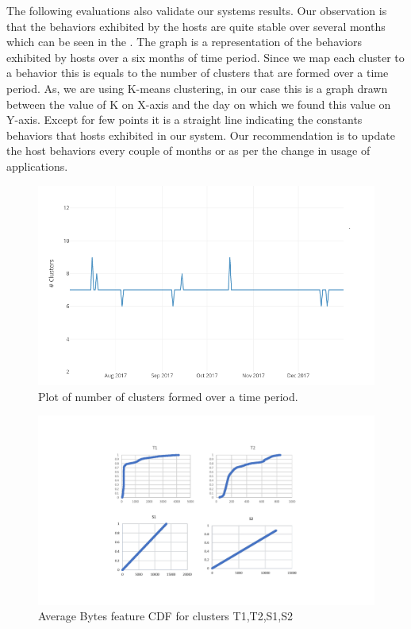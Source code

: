 The following evaluations also validate our systems results.
Our observation is that the behaviors exhibited by the hosts are quite stable over several months which can be seen in the  . The graph is a representation of the behaviors exhibited by hosts over a six months of time period. Since we map each cluster to a behavior this is equals to the number of clusters that are formed over a time period. As, we are using K-means clustering, in our case this is a graph drawn between the  value of K on X-axis and the day on which we found this value on Y-axis. Except for few points it is a straight line indicating the constants behaviors that hosts exhibited in our system. Our recommendation is to update the host behaviors every couple of months or as per the change in usage of applications.

\begin{figure}[t]
	\centerline{\includegraphics{constant.png}}
	\caption{ Plot of number of clusters formed over a time period.}%
\end{figure}


\begin{figure}[t]
	\centerline{\includegraphics[trim=2cm 2cm 2cm 2cm, scale = 0.7]{bytes_cdf.pdf}}
	\caption{ Average Bytes feature CDF for clusters T1,T2,S1,S2}%
\end{figure}

